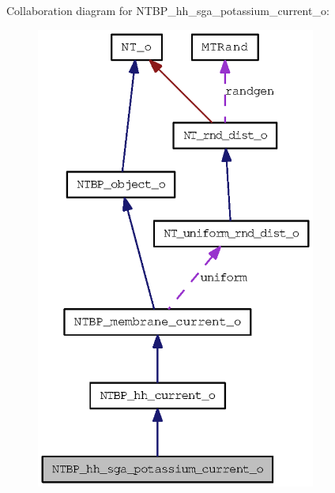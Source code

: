 Collaboration diagram for NTBP\_\-hh\_\-sga\_\-potassium\_\-current\_\-o:
\nopagebreak
\begin{figure}[H]
\begin{center}
\leavevmode
\includegraphics[width=261pt]{class_n_t_b_p__hh__sga__potassium__current__o__coll__graph}
\end{center}
\end{figure}
